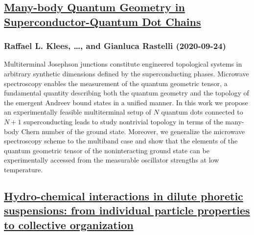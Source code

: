 \subsection*{\href{http://arxiv.org/abs/2009.11768v1}{Many-body Quantum Geometry in Superconductor-Quantum Dot Chains}}
\subsubsection*{Raffael L. Klees, \dots, and Gianluca Rastelli (2020-09-24)}
Multiterminal Josephson junctions constitute engineered topological systems
in arbitrary synthetic dimensions defined by the superconducting phases.
Microwave spectroscopy enables the measurement of the quantum geometric tensor,
a fundamental quantity describing both the quantum geometry and the topology of
the emergent Andreev bound states in a unified manner. In this work we propose
an experimentally feasible multiterminal setup of $N$ quantum dots connected to
$N+1$ superconducting leads to study nontrivial topology in terms of the
many-body Chern number of the ground state. Moreover, we generalize the
microwave spectroscopy scheme to the multiband case and show that the elements
of the quantum geometric tensor of the noninteracting ground state can be
experimentally accessed from the measurable oscillator strengths at low
temperature.

\subsection*{\href{http://arxiv.org/abs/2009.11756v1}{Hydro-chemical interactions in dilute phoretic suspensions: from  individual particle properties to collective organization}}
